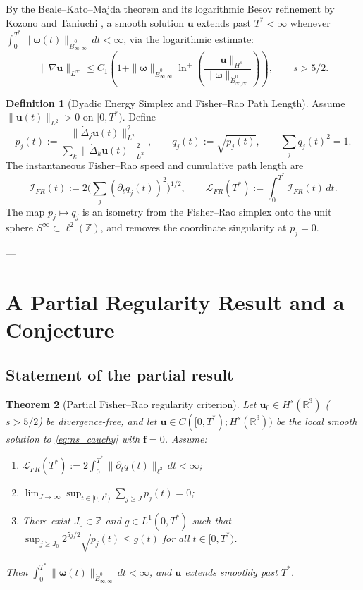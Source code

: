 \documentclass[11pt,a4paper]{article}
\newtheorem{theorem}{Theorem}[section]
\theoremstyle{definition}
\newtheorem{definition}[theorem]{Definition}
\theoremstyle{remark}
\begin{document}
By the Beale--Kato--Majda theorem \cite{BKM1984} and its logarithmic Besov refinement by Kozono and Taniuchi \cite{KozonoTaniuchi2000}, a smooth solution $\mathbf{u}$ extends past $T^* < \infty$ whenever $\int_0^{T^*} \|\boldsymbol{\omega}(t)\|_{\dot{B}^0_{\infty, \infty}} \, dt < \infty$, via the logarithmic estimate:
\begin{equation}
\label{eq:kt_ineq}
\|\nabla \mathbf{u}\|_{L^\infty} \le C_1 \left( 1 + \|\boldsymbol{\omega}\|_{\dot{B}^0_{\infty, \infty}} \ln^+\!\left(\frac{\|\mathbf{u}\|_{H^s}}{\|\boldsymbol{\omega}\|_{\dot{B}^0_{\infty, \infty}}}\right) \right), \qquad s > 5/2.
\end{equation}

\begin{definition}[Dyadic Energy Simplex and Fisher--Rao Path Length]
Assume $\|\mathbf{u}(t)\|_{L^2} > 0$ on $[0,T^*)$. Define
\[
p_j(t) := \frac{\|\dot{\Delta}_j \mathbf{u}(t)\|_{L^2}^2}{\sum_{k}\|\dot{\Delta}_k \mathbf{u}(t)\|_{L^2}^2},
\qquad
q_j(t) := \sqrt{p_j(t)},
\qquad
\sum_j q_j(t)^2 = 1.
\]
The instantaneous Fisher--Rao speed and cumulative path length are
\[
\mathcal{I}_{FR}(t) := 2\Big(\sum_j (\partial_t q_j(t))^2\Big)^{1/2},
\qquad
\mathcal{L}_{FR}(T^*) := \int_0^{T^*} \mathcal{I}_{FR}(t)\,dt.
\]
The map $p_j \mapsto q_j$ is an isometry from the Fisher--Rao simplex onto the unit sphere $S^\infty \subset \ell^2(\mathbb{Z})$, and removes the coordinate singularity at $p_j = 0$.
\end{definition}

---

\section{A Partial Regularity Result and a Conjecture}

\subsection{Statement of the partial result}

\begin{theorem}[Partial Fisher--Rao regularity criterion]
\label{thm:partial}
Let $\mathbf{u}_0 \in H^s(\mathbb{R}^3)$ ($s>5/2$) be divergence-free, and let $\mathbf{u} \in C([0,T^*); H^s(\mathbb{R}^3))$ be the local smooth solution to \eqref{eq:ns_cauchy} with $\mathbf{f}=0$. Assume:
\begin{enumerate}
  \item[\emph{(H1)}] $\mathcal{L}_{FR}(T^*) := 2\int_0^{T^*}\|\partial_t q(t)\|_{\ell^2}\,dt < \infty$;
  \item[\emph{(H1$'$)}] $\displaystyle\lim_{J\to\infty}\sup_{t\in[0,T^*)}\sum_{j\ge J} p_j(t) = 0$;
  \item[\emph{(H2)}] There exist $J_0\in\mathbb{Z}$ and $g\in L^1(0,T^*)$ such that
        $\sup_{j\ge J_0} 2^{5j/2}\sqrt{p_j(t)} \le g(t)$ for all $t\in[0,T^*)$.
\end{enumerate}
Then $\int_0^{T^*}\|\boldsymbol{\omega}(t)\|_{\dot{B}^0_{\infty,\infty}}\,dt<\infty$, and $\mathbf{u}$ extends smoothly past $T^*$.
\end{theorem}
\end{document}
